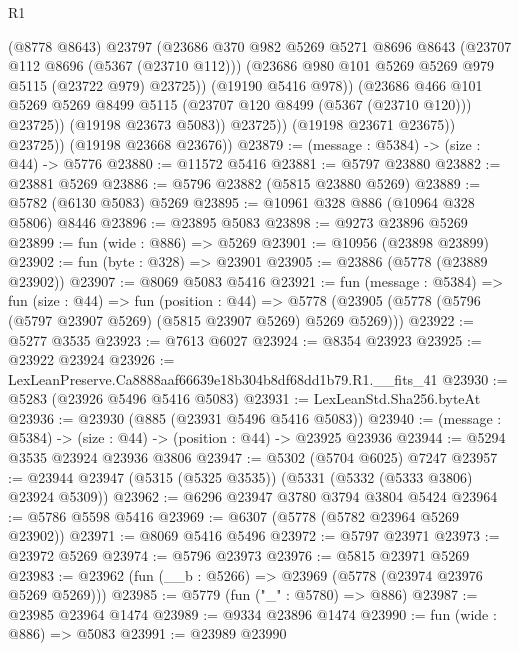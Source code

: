 \begin{lexlean}{R1}
\begin{coremodule}
                      (@8778 @8643)
                      @23797
                      (@23686
                        @370
                        @982
                        @5269
                        @5271
                        @8696
                        @8643
                        (@23707 @112 @8696 (@5367 (@23710 @112)))
                        (@23686 @980 @101 @5269 @5269 @979 @5115 (@23722 @979) @23725))
                      (@19190 @5416 @978))
                    (@23686
                      @466
                      @101
                      @5269
                      @5269
                      @8499
                      @5115
                      (@23707 @120 @8499 (@5367 (@23710 @120)))
                      @23725))
                  (@19198 @23673 @5083))
                @23725))
            (@19198 @23671 @23675))
          @23725))
      (@19198 @23668 @23676))
@23879 := (message : @5384) -> (size : @44) -> @5776
@23880 := @11572 @5416
@23881 := @5797 @23880
@23882 := @23881 @5269
@23886 := @5796 @23882 (@5815 @23880 @5269)
@23889 := @5782 (@6130 @5083) @5269
@23895 := @10961 @328 @886 (@10964 @328 @5806) @8446
@23896 := @23895 @5083
@23898 := @9273 @23896 @5269
@23899 := fun (wide : @886) => @5269
@23901 := @10956 (@23898 @23899)
@23902 := fun (byte : @328) => @23901
@23905 := @23886 (@5778 (@23889 @23902))
@23907 := @8069 @5083 @5416
@23921 := fun (message : @5384) =>
  fun (size : @44) =>
  fun (position : @44) =>
  @5778 (@23905 (@5778 (@5796 (@5797 @23907 @5269) (@5815 @23907 @5269) @5269 @5269)))
@23922 := @5277 @3535
@23923 := @7613 @6027
@23924 := @8354 @23923
@23925 := @23922 @23924
@23926 := LexLeanPreserve.Ca8888aaf66639e18b304b8df68dd1b79.R1.__fits_41
@23930 := @5283 (@23926 @5496 @5416 @5083)
@23931 := LexLeanStd.Sha256.byteAt
@23936 := @23930 (@885 (@23931 @5496 @5416 @5083))
@23940 := (message : @5384) -> (size : @44) -> (position : @44) -> @23925 @23936
@23944 := @5294 @3535 @23924 @23936 @3806
@23947 := @5302 (@5704 @6025) @7247
@23957 := @23944 @23947 (@5315 (@5325 @3535)) (@5331 (@5332 (@5333 @3806) @23924 @5309))
@23962 := @6296 @23947 @3780 @3794 @3804 @5424
@23964 := @5786 @5598 @5416
@23969 := @6307 (@5778 (@5782 @23964 @5269 @23902))
@23971 := @8069 @5416 @5496
@23972 := @5797 @23971
@23973 := @23972 @5269
@23974 := @5796 @23973
@23976 := @5815 @23971 @5269
@23983 := @23962 (fun (__b : @5266) => @23969 (@5778 (@23974 @23976 @5269 @5269)))
@23985 := @5779 (fun ("_" : @5780) => @886)
@23987 := @23985 @23964 @1474
@23989 := @9334 @23896 @1474
@23990 := fun (wide : @886) => @5083
@23991 := @23989 @23990

\end{coremodule}
\end{lexlean}
